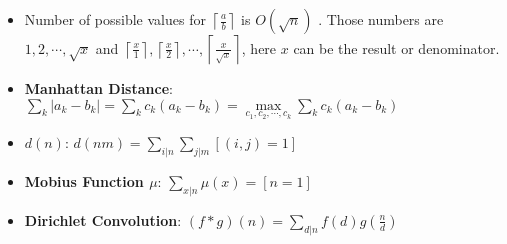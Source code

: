 \begin{itemize}

\item Number of possible values for $\left\lceil\frac{a}{b}\right\rceil$ is $O(\sqrt{n})$
. Those numbers are $1, 2, \cdots, \sqrt{x}$ and $\left\lceil\frac{x}{1}\right\rceil, \left\lceil\frac{x}{2}\right\rceil, \cdots, \left\lceil\frac{x}{\sqrt{x}}\right\rceil$, here $x$ can be the result or denominator.

\item \textbf{Manhattan Distance}:  $\sum\limits_{k} |a_k-b_k| = \sum\limits_{k} c_k(a_k-b_k) = \max\limits_{c_1,c_2,\cdots,c_k}\sum\limits_{k} c_k(a_k-b_k)$

\item \textbf{$d(n)$}: $d(nm) = \sum\limits_{i|n} \sum\limits_{j|m} \left[(i, j) = 1\right]$

\item \textbf{Mobius Function $\mu$}: $ \sum\limits_{x|n} \mu(x) = [n = 1] $

\item \textbf{Dirichlet Convolution}: $ (f*g)(n) = \sum\limits_{d|n}f(d)g\left(\frac{n}{d}\right) $

\end{itemize}
